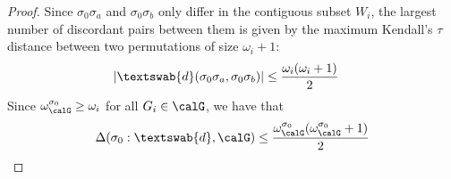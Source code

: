 \begin{proof}
Since $\sigma_0\sigma_a$ and $\sigma_0\sigma_b$ only differ in the contiguous subset $W_i$, the largest number of discordant pairs between them is given by the maximum Kendall's $\tau$ distance between two permutations of size $\omega_i + 1$:  
\begin{align*}
    |\textswab{d}(\sigma_0\sigma_a , \sigma_0\sigma_b)|
    &\leq \frac{\omega_i(\omega_i + 1)}{2}
\end{align*}
Since $\omega_{\calG}^{\sigma_0} \geq \omega_i$ for all $G_i \in \calG$, we have that 
\begin{align*}
    \Delta(\sigma_0 : \textswab{d}, \calG) \leq 
    \frac{\omega_{\calG}^{\sigma_0}(\omega_{\calG}^{\sigma_0} + 1)}{2}
\end{align*}
\end{proof}
 



